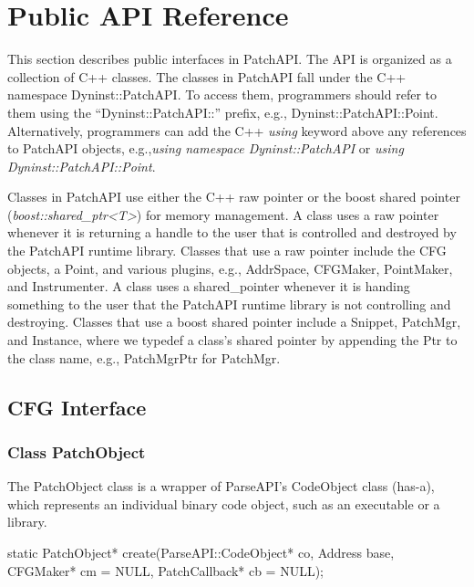 \section{Public API Reference}
\label{sec:public-api}

This section describes public interfaces in PatchAPI. The API is organized as a
collection of C++ classes. The classes in PatchAPI fall under the C++ namespace
Dyninst::PatchAPI. To access them, programmers should refer to them using the
``Dyninst::PatchAPI::'' prefix, e.g., Dyninst::PatchAPI::Point. Alternatively,
programmers can add the C++ \emph{using} keyword above any references to
PatchAPI objects, e.g.,\emph{using namespace Dyninst::PatchAPI} or \emph{using
  Dyninst::PatchAPI::Point}.

Classes in PatchAPI use either the C++ raw pointer or the boost shared pointer
(\emph{boost::shared\_ptr<T>}) for memory management. A class uses a raw pointer
whenever it is returning a handle to the user that is controlled and destroyed
by the PatchAPI runtime library. Classes that use a raw pointer include the CFG
objects, a Point, and various plugins, e.g., AddrSpace, CFGMaker, PointMaker,
and Instrumenter.  A class uses a shared\_pointer whenever it is handing
something to the user that the PatchAPI runtime library is not controlling and
destroying. Classes that use a boost shared pointer include a Snippet, PatchMgr,
and Instance, where we typedef a class's shared pointer by appending the Ptr to
the class name, e.g., PatchMgrPtr for PatchMgr.

\subsection{CFG Interface}

\subsubsection{Class PatchObject}
\label{sec:patchobject}


The PatchObject class is a wrapper of ParseAPI's CodeObject class (has-a), which
represents an individual binary code object, such as an executable or a library.


\begin{apient}
static PatchObject* create(ParseAPI::CodeObject* co, Address base,
                           CFGMaker* cm = NULL, PatchCallback* cb = NULL);
\end{apient}


